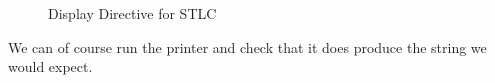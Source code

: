 \begin{figure}[h]
\caption{Display Directive for STLC\label{fig:exampledisplay}}
\end{figure}

We can of course run the printer and check that it does produce the string we would
expect.

